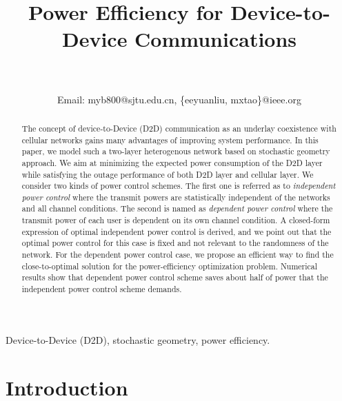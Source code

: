 \documentclass[12pt, draftclsnofoot, journal, letterpaper, onecolumn]{IEEEtran}
\begin{document}
\title{Power Efficiency for Device-to-Device Communications}

\author{\\\\
Email: myb800@sjtu.edu.cn, \{eeyuanliu, mxtao\}@ieee.org
}


\maketitle

\begin{abstract}
The concept of device-to-Device (D2D) communication as an underlay coexistence with cellular networks gains many advantages of improving system performance.
In this paper, we model such a two-layer heterogenous network based on stochastic geometry approach. We aim at minimizing the expected power consumption of the D2D layer while satisfying the outage performance of both D2D layer and cellular layer. We consider two kinds of power control schemes. The first one is referred as to \emph{independent power control} where the transmit powers are statistically independent of the networks and all channel conditions. The second is named as \emph{dependent power control} where the transmit power of each user is dependent on its own channel condition. A closed-form expression of optimal independent power control is derived, and we point out that the optimal power control for this case is fixed and not relevant to the randomness of the network. For the dependent power control case, we propose an efficient way to find the close-to-optimal solution for the power-efficiency optimization problem.
Numerical results show that dependent power control scheme saves about half of power that the independent power control scheme demands.
\end{abstract}

\begin{IEEEkeywords}
Device-to-Device (D2D), stochastic geometry, power efficiency.
\end{IEEEkeywords}



\IEEEpeerreviewmaketitle



\section{Introduction}
\end{document}
